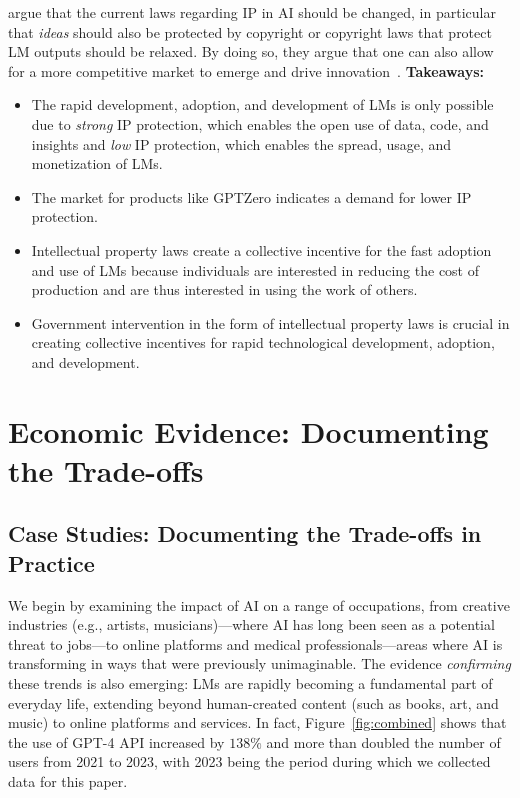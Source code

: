 {{\citet{TechMonopolies2025, restrepo2024society, deitrich2024book, restrepo2024science} argue that the current laws regarding IP in AI should be changed, in particular that \emph{ideas} should also be protected by copyright or copyright laws that protect LM outputs should be relaxed.
By doing so, they argue that one can also allow for a more competitive market to emerge and drive innovation~\citep{ TechMonopolies2025, restrepo2024science}.
\textbf{Takeaways:}
\begin{itemize}[wide,labelindent=0pt, itemsep=0pt, topsep=1pt]
    \item The rapid development, adoption, and development of LMs is only possible due to \emph{strong} IP protection, which enables the open use of data, code, and insights and \emph{low} IP protection, which enables the spread, usage, and monetization of LMs.
    \item The market for products like GPTZero indicates a demand for lower IP protection.
    \item Intellectual property laws create a collective incentive for the fast adoption and use of LMs because individuals are interested in reducing the cost of production and are thus interested in using the work of others.
    \item Government intervention in the form of intellectual property laws is crucial in creating collective incentives for rapid technological development, adoption, and development.
\end{itemize}



\section{Economic Evidence: Documenting the Trade-offs}

\label{Evidence}

\subsection{Case Studies: Documenting the Trade-offs in Practice}

We begin by examining the impact of AI on a range of occupations, from creative industries (e.g., artists, musicians)---where AI has long been seen as a potential threat to jobs---to online platforms and medical professionals---areas where AI is transforming in ways that were previously unimaginable.
The evidence \emph{confirming} these trends is also emerging: LMs are rapidly becoming a fundamental part of everyday life, extending beyond human-created content (such as books, art, and music) to online platforms and services. 
In fact, Figure~\ref{fig:combined} shows that the use of GPT-4 API increased by $138\%$ and more than doubled the number of users from 2021 to 2023, with 2023 being the period during which we collected data for this paper. 
}}

